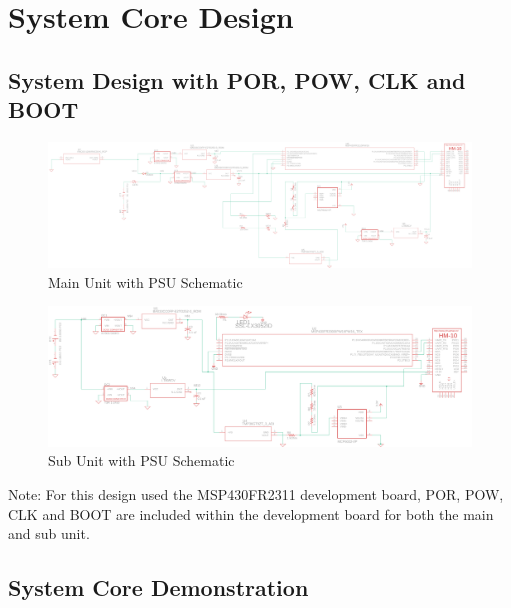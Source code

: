 \section{System Core Design}
\subsection{System Design with POR, POW, CLK and BOOT}
\begin{landscape}
  \begin{center}
  \begin{figure}[H]
    \includegraphics[width=\pdfpagewidth,height=0.65\textheight]{../System-Schematic-Diagrams/Figures/main-unit-and-psu.png}
    \caption{Main Unit with PSU Schematic}
    \label{fig:main-with-psu-schematic-core}
  \end{figure}
  \end{center}
  \begin{center}
  \begin{figure}[H]
    \includegraphics[width=\pdfpagewidth,height=0.65\textheight]{../System-Schematic-Diagrams/Figures/sub-unit-and-psu.png}
    \caption{Sub Unit with PSU Schematic}
    \label{fig:sub-with-psu-schematic-core}
  \end{figure}
  \end{center}
\end{landscape}
Note: For this design used the MSP430FR2311 development board, POR, POW, CLK and BOOT are included within the development board for both the main and sub unit.
\subsection{System Core Demonstration}
